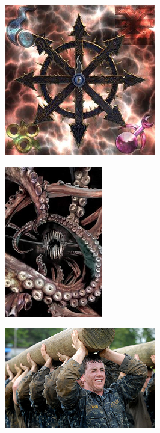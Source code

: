 \begin{figure}
	\begin{center}
		\includegraphics[width=\figwidth]{pics/6/7.png}
	\end{center}
\end{figure}

\begin{figure}
	\begin{center}
		\includegraphics[width=\figwidth]{pics/6/8.png}
	\end{center}
\end{figure}

\begin{figure}
	\begin{center}
		\includegraphics[width=\figwidth]{pics/6/9.png}
	\end{center}
\end{figure}

